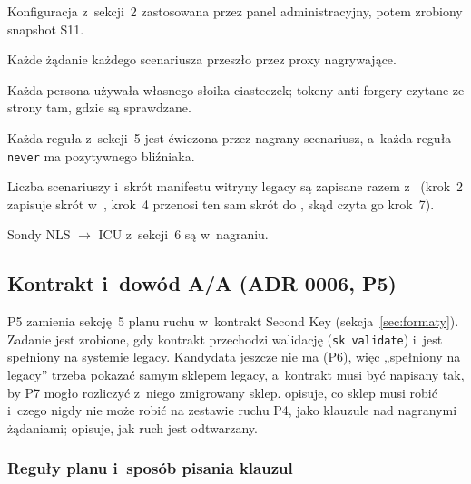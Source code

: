 \begin{checklista}
  \item Konfiguracja z~sekcji~2 zastosowana przez panel administracyjny, potem zrobiony
    snapshot S11.
  \item Każde żądanie każdego scenariusza przeszło przez proxy nagrywające.
  \item Każda persona używała własnego słoika ciasteczek; tokeny anti-forgery czytane ze
    strony tam, gdzie są sprawdzane.
  \item Każda reguła z~sekcji~5 jest ćwiczona przez nagrany scenariusz, a~każda reguła
    \texttt{never} ma pozytywnego bliźniaka.
  \item Liczba scenariuszy i~skrót manifestu witryny legacy są zapisane razem
    z~ (krok~2 zapisuje skrót w~, krok~4 przenosi ten sam
    skrót  do , skąd czyta go krok~7).
  \item Sondy NLS $\rightarrow$ ICU z~sekcji~6 są w~nagraniu.
\end{checklista}


\subsection{Kontrakt i~dowód A/A (ADR 0006, P5)}\label{sec:bench-kontrakt}

P5 zamienia sekcję~5 planu ruchu w~kontrakt Second Key (sekcja~\ref{sec:formaty}).
Zadanie jest zrobione, gdy kontrakt przechodzi walidację (\texttt{sk validate}) i~jest
spełniony na systemie legacy. Kandydata jeszcze nie ma (P6), więc „spełniony na legacy”
trzeba pokazać samym sklepem legacy, a~kontrakt musi być napisany tak, by P7 mogło
rozliczyć z~niego zmigrowany sklep.  opisuje, co sklep musi
robić i~czego nigdy nie może robić na zestawie ruchu P4, jako klauzule nad nagranymi
żądaniami;  opisuje, jak ruch jest odtwarzany.


\subsubsection{Reguły planu i~sposób pisania klauzul}\label{sec:bench-kontrakt-reguly}

